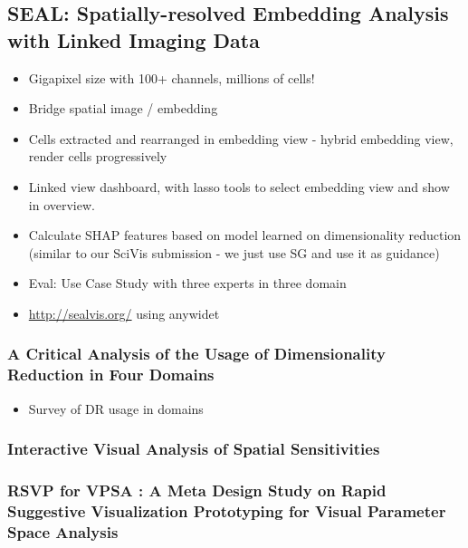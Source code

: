 \documentclass[a4paper]{article}
\begin{document}
\subsection{SEAL: Spatially-resolved Embedding Analysis with Linked Imaging Data}
\begin{itemize}
    \item Gigapixel size with 100+ channels, millions of cells!
    \item Bridge spatial image / embedding
    \item Cells extracted and rearranged in embedding view - hybrid embedding view, render cells progressively
    \item Linked view dashboard, with lasso tools to select embedding view and show in overview.
    \item Calculate SHAP features based on model learned on dimensionality reduction (similar to our SciVis submission - we just use SG and use it as guidance)
    \item Eval: Use Case Study with three experts in three domain
    \item \url{http://sealvis.org/} using anywidet
\end{itemize}
\subsubsection{A Critical Analysis of the Usage of Dimensionality Reduction in Four Domains}
\begin{itemize}
    \item Survey of DR usage in domains
\end{itemize}
\subsubsection{Interactive Visual Analysis of Spatial Sensitivities}

\subsubsection{RSVP for VPSA : A Meta Design Study on Rapid Suggestive Visualization Prototyping for Visual Parameter Space Analysis}
\end{document}
